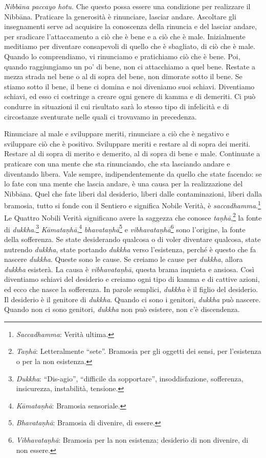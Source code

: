 \emph{Nibbāna paccayo hotu.} Che questo possa essere una condizione per
realizzare il Nibbāna. Praticare la generosità è rinunciare,
lasciar andare. Ascoltare gli insegnamenti serve ad acquisire la
conoscenza della rinuncia e del lasciar andare, per sradicare
l'attaccamento a ciò che è bene e a ciò che è male. Inizialmente
meditiamo per diventare consapevoli di quello che è sbagliato, di ciò
che è male. Quando lo comprendiamo, vi rinunciamo e pratichiamo ciò che
è bene. Poi, quando raggiungiamo un po' di bene, non ci attacchiamo a
quel bene. Restate a mezza strada nel bene o al di sopra del bene, non
dimorate sotto il bene. Se stiamo sotto il bene, il bene ci domina e noi
diveniamo suoi schiavi. Diventiamo schiavi, ed esso ci costringe a
creare ogni genere di kamma e di demeriti. Ci può condurre in
situazioni il cui risultato sarà lo stesso tipo di infelicità e di
circostanze sventurate nelle quali ci trovavamo in precedenza.

Rinunciare al male e sviluppare meriti, rinunciare a ciò che è negativo
e sviluppare ciò che è positivo. Sviluppare meriti e restare al di sopra
dei meriti. Restare al di sopra di merito e demerito, al di sopra di
bene e male. Continuate a praticare con una mente che sta rinunciando,
che sta lasciando andare e diventando libera. Vale sempre,
indipendentemente da quello che state facendo: se lo fate con una mente
che lascia andare, è una causa per la realizzazione del Nibbāna.
Quel che fate liberi dal desiderio, liberi dalle contaminazioni, liberi
dalla bramosia, tutto si fonde con il Sentiero e significa Nobile
Verità, è \emph{saccadhamma}.\footnote{\emph{Saccadhamma}: Verità
  ultima.} Le Quattro Nobili Verità significano avere la saggezza che
conosce \emph{taṇhā},\footnote{\emph{Taṇhā}: Letteralmente ``sete''.
  Bramosia per gli oggetti dei sensi, per l'esistenza o per la non
  esistenza.} la fonte di \emph{dukkha}.\footnote{\emph{Dukkha}:
  ``Dis-agio'', ``difficile da sopportare'', insoddisfazione,
  sofferenza, insicurezza, instabilità, tensione.}
\emph{Kāmataṇhā},\footnote{\emph{Kāmataṇhā}: Bramosia sensoriale.}
\emph{bhavataṇhā}\footnote{\emph{Bhavataṇhā}: Bramosia di divenire, di
  essere.} e \emph{vibhavataṇhā}\footnote{\emph{Vibhavataṇhā}: Bramosia
  per la non esistenza; desiderio di non divenire, di non essere.} sono
l'origine, la fonte della sofferenza. Se state desiderando qualcosa o di
voler diventare qualcosa, state nutrendo \emph{dukkha}, state portando
\emph{dukkha} verso l'esistenza, perché è questo che fa nascere
\emph{dukkha}. Queste sono le cause. Se creiamo le cause per
\emph{dukkha}, allora \emph{dukkha} esisterà. La causa è
\emph{vibhavataṇhā}, questa brama inquieta e ansiosa. Così diventiamo
schiavi del desiderio e creiamo ogni tipo di kamma e di cattive
azioni, ed ecco che nasce la sofferenza. In parole semplici,
\emph{dukkha} è il figlio del desiderio. Il desiderio è il genitore di
\emph{dukkha}. Quando ci sono i genitori, \emph{dukkha} può nascere.
Quando non ci sono genitori, \emph{dukkha} non può esistere, non c'è
discendenza.

